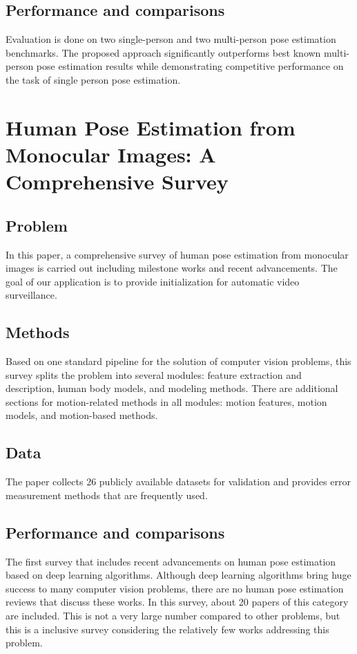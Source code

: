 \subsection{Performance and comparisons}
Evaluation is done on two single-person and two multi-person pose estimation benchmarks. The proposed approach significantly outperforms best known multi-person pose estimation results while demonstrating competitive performance on the task of single person pose estimation.

\section{Human Pose Estimation from Monocular Images: A Comprehensive Survey
\cite{humanmonocular}}

\subsection{Problem}
\par In this paper, a comprehensive survey of human pose estimation from monocular images is carried out including milestone works and recent advancements. The goal of our application is to provide initialization for automatic video surveillance. 
\subsection{Methods}
\par Based on one standard pipeline for the solution of computer vision problems, this survey splits the problem into several modules: feature extraction and description, human body models, and modeling methods. There are additional sections for motion-related methods in all modules: motion features, motion models, and motion-based methods.

\subsection{Data}
The paper collects 26 publicly available datasets for validation and provides error measurement methods that are frequently used.
\subsection{Performance and comparisons}
\par The first survey that includes recent advancements on human pose estimation based on deep learning algorithms. Although deep learning algorithms bring huge success to many computer vision problems, there are no human pose estimation reviews that discuss these works. In this survey, about 20 papers of this category are included. This is not a very large number compared to other problems, but this is a inclusive survey considering the relatively few works addressing this problem.


